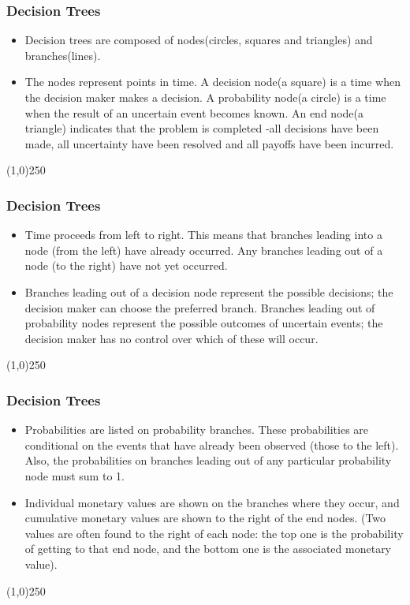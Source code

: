 \begin{frame}
\frametitle{Decision Trees}
\begin{itemize}
\item Decision trees are composed of nodes(circles, squares and triangles) and branches(lines).
\item The nodes represent points in time. A decision node(a square) is a time when the decision maker makes a decision. A probability node(a circle) is a time when the result of an uncertain event becomes known. An end node(a triangle) indicates that the problem is completed -all decisions have been made, all uncertainty have been resolved and all payoffs have been incurred.
\end{itemize}
\end{frame}\begin{center}\line(1,0){250}\end{center}







\begin{frame}
\frametitle{Decision Trees}
\begin{itemize}
\item Time proceeds from left to right. This means that branches leading into a node (from the left) have already occurred. Any branches leading out of a node (to the right) have not yet occurred.
\item Branches leading out of a decision node represent the possible decisions; the decision maker can choose the preferred branch. Branches leading out of probability nodes represent the possible outcomes of uncertain events; the decision maker has no control over which of these will occur.
\end{itemize}
\end{frame}\begin{center}\line(1,0){250}\end{center}



\begin{frame}
\frametitle{Decision Trees}
\begin{itemize}
\item Probabilities are listed on probability branches. These probabilities are conditional on the events that have already been observed (those to the left). Also, the probabilities on branches leading out of any particular probability node must sum to 1.
\item Individual monetary values are shown on the branches where they occur, and cumulative monetary values are shown to the right of the end nodes. (Two values are often found to the right of each node: the top one is the probability of getting to that end node, and the bottom one is the associated monetary value).
\end{itemize}
\end{frame}\begin{center}\line(1,0){250}\end{center}









